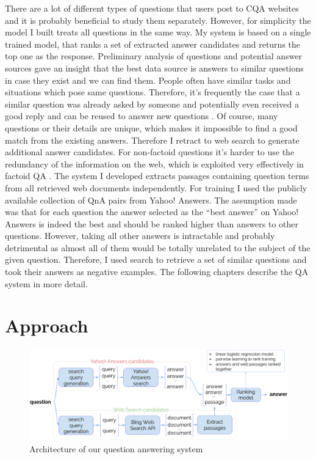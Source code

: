 \documentclass[]{article}
\begin{document}
There are a lot of different types of questions that users post to CQA websites and it is probably beneficial to study them separately.
However, for simplicity the model I built treats all questions in the same way.
My system is based on a single trained model, that ranks a set of extracted answer candidates and returns the top one as the response.
Preliminary analysis of questions and potential answer sources gave an insight that the best data source is answers to similar questions in case they exist and we can find them.
People often have similar tasks and situations which pose same questions.
Therefore, it's frequently the case that a similar question was already asked by someone and potentially even received a good reply and can be reused to answer new questions \cite{Shtok:2012:LPA:2187836.2187939}.
Of course, many questions or their details are unique, which makes it impossible to find a good match from the existing answers.
Therefore I retract to web search to generate additional answer candidates.
For non-factoid questions it's harder to use the redundancy of the information on the web, which is exploited very effectively in factoid QA \cite{Lin:2007:EPU:1229179.1229180}.
The system I developed extracts passages containing question terms from all retrieved web documents independently.
For training I used the publicly available collection of QnA pairs from Yahoo! Answers.
The assumption made was that for each question the answer selected as the ``best answer'' on Yahoo! Answers is indeed the best and should be ranked higher than answers to other questions.
However, taking all other answers is intractable and probably detrimental as almost all of them would be totally unrelated to the subject of the given question.
Therefore, I used search to retrieve a set of similar questions and took their answers as negative examples.
The following chapters describe the QA system in more detail.

\section{Approach}

\begin{figure}
	\includegraphics[width=460px]{img/qa_model}
	\caption{Architecture of our question answering system}
	\label{figure:qa_model}
\end{figure}
\end{document}
